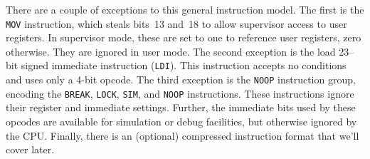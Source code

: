 \documentclass{gqtekspec}
\begin{document}
There are a couple of exceptions to this general instruction model.  The
first is the {\tt MOV} instruction, which steals bits~13 and~18 to allow
supervisor access to user registers.  In supervisor mode, these are set to
one to reference user registers, zero otherwise.  They are ignored in user
mode.  The second exception is the load 23--bit signed immediate instruction
({\tt LDI}).  This instruction accepts no conditions and uses only a 4-bit
opcode.  The third exception is the {\tt NOOP} instruction group, encoding the
{\tt BREAK}, {\tt LOCK}, {\tt SIM}, and {\tt NOOP} instructions.  These
instructions ignore their register and immediate settings.  Further, the
immediate bits used by these opcodes are available for simulation or debug
facilities, but otherwise ignored by the CPU.  Finally, there is an (optional)
compressed instruction format that we'll cover later.
\end{document}

